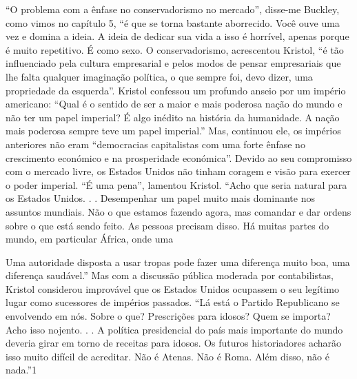 “O problema com a ênfase no conservadorismo no mercado”, disse-me Buckley, como vimos no capítulo 5, “é que se torna bastante aborrecido. Você ouve uma vez e domina a ideia. A ideia de dedicar sua vida a isso é horrível, apenas porque é muito repetitivo. É como sexo. O conservadorismo, acrescentou Kristol, “é tão influenciado pela cultura empresarial e pelos modos de pensar empresariais que lhe falta qualquer imaginação política, o que sempre foi, devo dizer, uma propriedade da esquerda”. Kristol confessou um profundo anseio por um império americano: “Qual é o sentido de ser a maior e mais poderosa nação do mundo e não ter um papel imperial? É algo inédito na história da humanidade. A nação mais poderosa sempre teve um papel imperial.” Mas, continuou ele, os impérios anteriores não eram “democracias capitalistas com uma forte ênfase no crescimento económico e na prosperidade económica”. Devido ao seu compromisso com o mercado livre, os Estados Unidos não tinham coragem e visão para exercer o poder imperial. “É uma pena”, lamentou Kristol. “Acho que seria natural para os Estados Unidos. . . Desempenhar um papel muito mais dominante nos assuntos mundiais. Não o que estamos fazendo agora, mas comandar e dar ordens sobre o que está sendo feito. As pessoas precisam disso. Há muitas partes do mundo, em particular África, onde uma
 \par 
Uma autoridade disposta a usar tropas pode fazer uma diferença muito boa, uma diferença saudável.” Mas com a discussão pública moderada por contabilistas, Kristol considerou improvável que os Estados Unidos ocupassem o seu legítimo lugar como sucessores de impérios passados. “Lá está o Partido Republicano se envolvendo em nós. Sobre o que? Prescrições para idosos? Quem se importa? Acho isso nojento. . . A política presidencial do país mais importante do mundo deveria girar em torno de receitas para idosos. Os futuros historiadores acharão isso muito difícil de acreditar. Não é Atenas. Não é Roma. Além disso, não é nada.”{\color{blue}1}
 \par 
